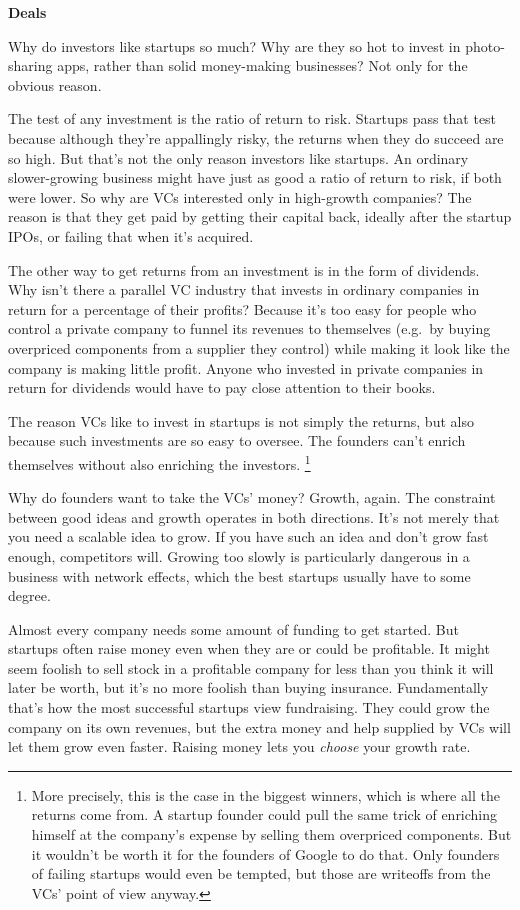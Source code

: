 \textbf{Deals}

Why do investors like startups so much? Why are they so hot to invest in
photo-sharing apps, rather than solid money-making businesses? Not only
for the obvious reason.

The test of any investment is the ratio of return to risk. Startups pass
that test because although they're appallingly risky, the returns when
they do succeed are so high. But that's not the only reason investors
like startups. An ordinary slower-growing business might have just as
good a ratio of return to risk, if both were lower. So why are VCs
interested only in high-growth companies? The reason is that they get
paid by getting their capital back, ideally after the startup IPOs, or
failing that when it's acquired.

The other way to get returns from an investment is in the form of
dividends. Why isn't there a parallel VC industry that invests in
ordinary companies in return for a percentage of their profits? Because
it's too easy for people who control a private company to funnel its
revenues to themselves (e.g.~by buying overpriced components from a
supplier they control) while making it look like the company is making
little profit. Anyone who invested in private companies in return for
dividends would have to pay close attention to their books.

The reason VCs like to invest in startups is not simply the returns, but
also because such investments are so easy to oversee. The founders can't
enrich themselves without also enriching the investors.
\footnote{More precisely, this is the case in the biggest winners, which
is where all the returns come from. A startup founder could pull the
same trick of enriching himself at the company's expense by selling them
overpriced components. But it wouldn't be worth it for the founders of
Google to do that. Only founders of failing startups would even be
tempted, but those are writeoffs from the VCs' point of view anyway.}

Why do founders want to take the VCs' money? Growth, again. The
constraint between good ideas and growth operates in both directions.
It's not merely that you need a scalable idea to grow. If you have such
an idea and don't grow fast enough, competitors will. Growing too slowly
is particularly dangerous in a business with network effects, which the
best startups usually have to some degree.

Almost every company needs some amount of funding to get started. But
startups often raise money even when they are or could be profitable. It
might seem foolish to sell stock in a profitable company for less than
you think it will later be worth, but it's no more foolish than buying
insurance. Fundamentally that's how the most successful startups view
fundraising. They could grow the company on its own revenues, but the
extra money and help supplied by VCs will let them grow even faster.
Raising money lets you \emph{choose} your growth rate.

